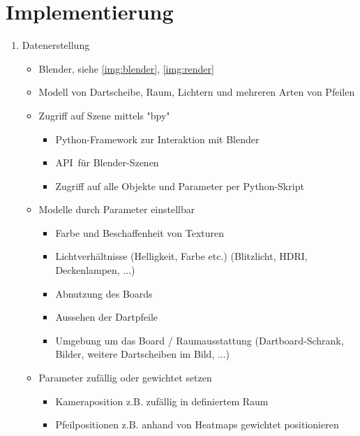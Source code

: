 \section{Implementierung}
\label{sec:implementierung}

\begin{enumerate}
    \item Datenerstellung
    \begin{itemize}
        \item Blender, siehe \autoref{img:blender}, \autoref{img:render}
        \item Modell von Dartscheibe, Raum, Lichtern und mehreren Arten von Pfeilen

        \item Zugriff auf Szene mittels "bpy"
        \begin{itemize}
            \item Python-Framework zur Interaktion mit Blender
            \item \glqq API\grqq\, für Blender-Szenen
            \item Zugriff auf alle Objekte und Parameter per Python-Skript
        \end{itemize}

        \item Modelle durch Parameter einstellbar
        \begin{itemize}
            \raggedright
            \item Farbe und Beschaffenheit von Texturen
            \item Lichtverhältnisse (Helligkeit, Farbe etc.) (Blitzlicht, HDRI, Deckenlampen, ...)
            \item Abnutzung des Boards
            \item Aussehen der Dartpfeile
            \item Umgebung um das Board / Raumausstattung (Dartboard-Schrank, Bilder, weitere Dartscheiben im Bild, ...)
        \end{itemize}

        \item Parameter zufällig oder gewichtet setzen
        \begin{itemize}
            \item Kameraposition z.B. zufällig in definiertem Raum
            \item Pfeilpositionen z.B. anhand von Heatmaps gewichtet positionieren
        \end{itemize}


\end{itemize}
\end{enumerate}
